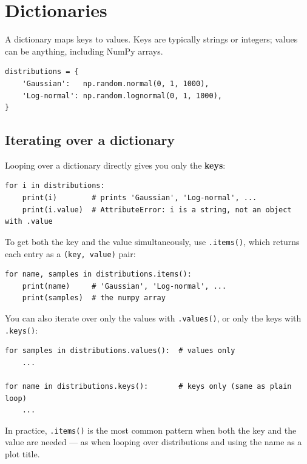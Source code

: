 \documentclass[11pt]{article}
\begin{document}
\section{Dictionaries}

A dictionary maps keys to values. Keys are typically strings or integers; values
can be anything, including NumPy arrays.

\begin{lstlisting}[style=python]
distributions = {
    'Gaussian':   np.random.normal(0, 1, 1000),
    'Log-normal': np.random.lognormal(0, 1, 1000),
}
\end{lstlisting}

\subsection{Iterating over a dictionary}

Looping over a dictionary directly gives you only the \textbf{keys}:

\begin{lstlisting}[style=python]
for i in distributions:
    print(i)        # prints 'Gaussian', 'Log-normal', ...
    print(i.value)  # AttributeError: i is a string, not an object with .value
\end{lstlisting}

To get both the key and the value simultaneously, use \texttt{.items()}, which
returns each entry as a \texttt{(key, value)} pair:

\begin{lstlisting}[style=python]
for name, samples in distributions.items():
    print(name)     # 'Gaussian', 'Log-normal', ...
    print(samples)  # the numpy array
\end{lstlisting}

You can also iterate over only the values with \texttt{.values()}, or only the
keys with \texttt{.keys()}:

\begin{lstlisting}[style=python]
for samples in distributions.values():  # values only
    ...

for name in distributions.keys():       # keys only (same as plain loop)
    ...
\end{lstlisting}

In practice, \texttt{.items()} is the most common pattern when both the key and
the value are needed --- as when looping over distributions and using the name as
a plot title.
\end{document}
